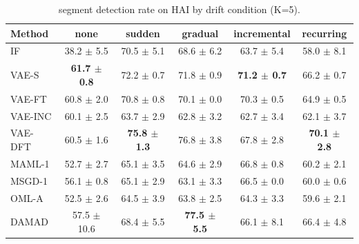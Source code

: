 \begin{table}[t]
\centering
\small
\caption{segment detection rate on HAI by drift condition (K=5).}
\label{tab:drift_segment_detection_rate_hai}
\begin{tabular}{lccccc}
\toprule
Method & none & sudden & gradual & incremental & recurring \\
\midrule
IF & 38.2 $\pm$ 5.5 & 70.5 $\pm$ 5.1 & 68.6 $\pm$ 6.2 & 63.7 $\pm$ 5.4 & 58.0 $\pm$ 8.1 \\
VAE-S & \textbf{61.7 $\pm$ 0.8} & 72.2 $\pm$ 0.7 & 71.8 $\pm$ 0.9 & \textbf{71.2 $\pm$ 0.7} & 66.2 $\pm$ 0.7 \\
VAE-FT & 60.8 $\pm$ 2.0 & 70.8 $\pm$ 0.8 & 70.1 $\pm$ 0.0 & 70.3 $\pm$ 0.5 & 64.9 $\pm$ 0.5 \\
VAE-INC & 60.1 $\pm$ 2.5 & 63.7 $\pm$ 2.9 & 62.8 $\pm$ 3.2 & 62.7 $\pm$ 3.4 & 62.1 $\pm$ 3.7 \\
VAE-DFT & 60.5 $\pm$ 1.6 & \textbf{75.8 $\pm$ 1.3} & 76.8 $\pm$ 3.8 & 67.8 $\pm$ 2.8 & \textbf{70.1 $\pm$ 2.8} \\
MAML-1 & 52.7 $\pm$ 2.7 & 65.1 $\pm$ 3.5 & 64.6 $\pm$ 2.9 & 66.8 $\pm$ 0.8 & 60.2 $\pm$ 2.1 \\
MSGD-1 & 56.1 $\pm$ 0.8 & 65.1 $\pm$ 2.9 & 63.1 $\pm$ 3.3 & 66.5 $\pm$ 0.0 & 60.0 $\pm$ 0.6 \\
OML-A & 52.5 $\pm$ 2.6 & 64.5 $\pm$ 3.9 & 63.8 $\pm$ 2.5 & 64.3 $\pm$ 3.3 & 59.6 $\pm$ 2.1 \\
DAMAD & 57.5 $\pm$ 10.6 & 68.4 $\pm$ 5.5 & \textbf{77.5 $\pm$ 5.5} & 66.1 $\pm$ 8.1 & 66.4 $\pm$ 4.8 \\
\bottomrule
\end{tabular}
\end{table}

